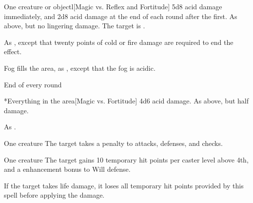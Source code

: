 \spellrng{\rngfar}
\begin{spelltarget}{One creature or object}l[Magic vs. Reflex and Fortitude]
    \spellsuccess[Reflex] 5d8 acid damage immediately, and 2d8 acid damage at the end of each round after the first.
    \spellfailure[Reflex] As above, but no lingering damage.
    \spellsuccess[Fortitude] The target is \sickened.
\end{spelltarget}
\spellnotes As , except that twenty points of cold or fire damage are required to end the effect.

\spelldur{\durshort}
\spellline
\spelleffect Fog fills the area, as , except that the fog is acidic.
\begin{spelltrigger}{End of every round}
    \begin{spelltarget}*{Everything in the area}[Magic vs. Fortitude]
        \spellsuccess 4d6 acid damage.
        \spellfailure As above, but half damage.
    \end{spelltarget}
\end{spelltrigger}
\spellnotes As .

\spellrng{\rngmed}
\spelldur{\durshort}
\begin{spelltarget}{One creature}
    \spelleffect The target takes a  penalty to attacks, defenses, and checks.
\end{spelltarget}

\spellrng{\rngclose}
\spelldur{\durshort}
\begin{spelltarget}{One creature}
    \spelleffect The target gains 10 temporary hit points  per caster level above 4th, and a  enhancement bonus to Will defense. \spellbonusscalingdescription
\end{spelltarget}
\spellnotes If the target takes life damage, it loses all temporary hit points provided by this spell before applying the damage.

